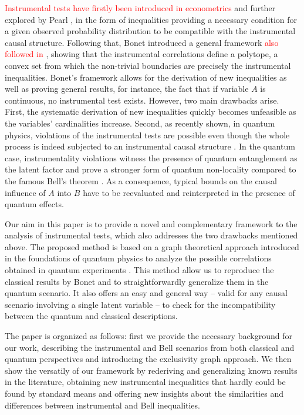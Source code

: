\documentclass[letterpaper]{article}
\begin{document}
\textcolor{red}{Instrumental tests have firstly been introduced in econometrics \cite{Wooldridge2015}} and further explored by Pearl \cite{pearl1995}, in the form of inequalities providing a necessary condition for a given observed
probability distribution to be compatible with the instrumental causal
structure. Following that, Bonet \cite{bonet2001} introduced a general
framework \textcolor{red}{also followed in \cite{Ramsahai2012}}, showing that the instrumental correlations define a polytope, a convex set from which the non-trivial boundaries are precisely the instrumental
inequalities. Bonet's framework allows for the derivation of new inequalities
as well as proving general results, for instance, the fact that if variable $A$
is continuous, no instrumental test exists. However, two main drawbacks arise. First, the systematic derivation of new inequalities quickly becomes
unfeasible as the variables' cardinalities increase. Second, as recently shown,
in quantum physics, violations of the instrumental tests are possible even
though the whole process is indeed subjected to an instrumental causal structure
\cite{chaves2018, himbeeck2018}. In the quantum case, instrumentality violations
witness the presence of quantum entanglement as the latent factor and prove a
stronger form of quantum non-locality compared to the famous Bell's theorem
\cite{chaves2018}. As a consequence, typical bounds on the causal influence of
$A$ into $B$ have to be reevaluated and reinterpreted in the presence of quantum
effects.

Our aim in this paper is to provide a novel and complementary framework to the
analysis of instrumental tests, which also addresses the two drawbacks mentioned
above. The proposed method is based on a graph theoretical approach introduced
in the foundations of quantum physics to analyze the possible correlations
obtained in quantum experiments \cite{cabello2014,rabelo2014}. This method allow us to reproduce the classical results by Bonet and to straightforwardly generalize them in the quantum scenario. It also offers an easy and general way -- valid for any causal scenario involving a single latent variable -- to check for the incompatibility between the quantum and classical descriptions.

The paper is organized as follows: first we provide the necessary background for our work, describing the instrumental and Bell scenarios from both classical and quantum perspectives and introducing the exclusivity graph approach. We then show the versatily of our framework by rederiving and generalizing known results in the literature, obtaining new instrumental inequalities that hardly could be found by standard means and offering new insights about the similarities and differences between instrumental and Bell inequalities.
\end{document}
